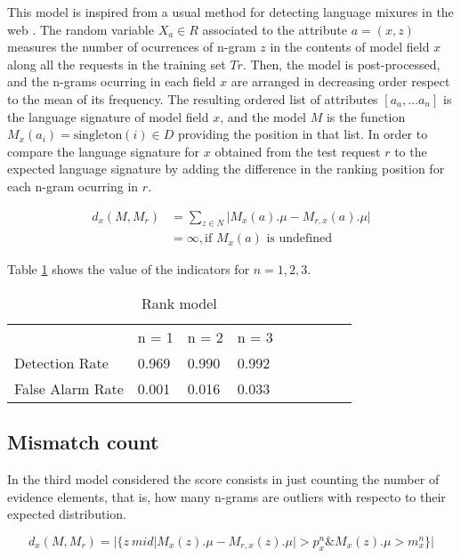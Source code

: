 \documentclass[runningheads,a4paper]{llncs}
\begin{document}
This model is inspired from a usual method for detecting language mixures in the web \cite{XX}. The random variable $X_a \in R$ associated to the attribute $a=(x,z)$ measures the number of ocurrences of n-gram $z$ in the contents of model field $x$ along all the requests in the training set $Tr$. Then, the model is post-processed, and the n-grams ocurring in each field $x$ are arranged in decreasing order respect to the mean of its frequency.  The resulting ordered list of attributes $[a_a,\ldots a_n]$ is the language signature of model field $x$, and the model $M$ is the function $M_x(a_i)=\text{singleton}(i) \in D$ providing the position in that list. In order to compare the language signature for $x$ obtained from the test request $r$ to the expected language signature by adding the difference in the ranking position for each n-gram ocurring in $r$. 

\begin{align*}
\label{RankDistance}
d_x(M,M_r) & = \sum_{z\in N} \lvert M_x(a).\mu - M_{r,x}(a).\mu\rvert \\
           & = \infty, \text{if } M_x(a) \text{ is undefined} 
\end{align*}

Table \ref{RankModelResults} shows the value of the indicators for $n=1,2,3$.


\begin{table}[]
\centering
\caption{Rank model}
\label{RankModelResults}
\begin{tabular}{lllllllll}
                 & n = 1   & n = 2   & n = 3   \\
Detection Rate   & 0.969   &  0.990  & 0.992   \\
False Alarm Rate & 0.001   &  0.016  & 0.033   \\
\end{tabular}
\end{table}

\subsection{Mismatch count}

In the third model considered the score consists in just counting the number of evidence elements, that is, how many n-grams are outliers with respecto to their expected distribution. 

\begin{equation}
\label{MismatchCountDistance}
d_x(M,M_r) = \lvert \{ z \ mid \lvert M_x(z).\mu - M_{r,x}(z).\mu\rvert > p^n_x \& M_x(z).\mu > m^n_x\} \rvert 
\end{equation}
\end{document}
